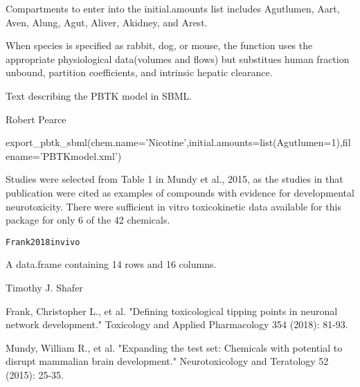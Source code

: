 \documentclass[a4paper]{book}
\begin{document}
%
\begin{Details}\relax
Compartments to enter into the initial.amounts list includes Agutlumen,
Aart, Aven, Alung, Agut, Aliver, Akidney, and Arest.

When species is specified as rabbit, dog, or mouse, the function uses the
appropriate physiological data(volumes and flows) but substitues human
fraction unbound, partition coefficients, and intrinsic hepatic clearance.
\end{Details}
%
\begin{Value}
Text describing the PBTK model in SBML.
\end{Value}
%
\begin{Author}\relax
Robert Pearce
\end{Author}
%
\begin{Examples}
\begin{ExampleCode}


export_pbtk_sbml(chem.name='Nicotine',initial.amounts=list(Agutlumen=1),filename='PBTKmodel.xml')


\end{ExampleCode}
\end{Examples}
%
\begin{Description}\relax
Studies were selected from Table 1 in Mundy et al., 2015, as
the studies in that publication were cited as examples of
compounds with evidence for developmental neurotoxicity. There
were sufficient in vitro toxicokinetic data available for this
package for only 6 of the 42 chemicals.
\end{Description}
%
\begin{Usage}
\begin{verbatim}
Frank2018invivo
\end{verbatim}
\end{Usage}
%
\begin{Format}
A data.frame containing 14 rows and 16 columns.
\end{Format}
%
\begin{Author}\relax
Timothy J. Shafer
\end{Author}
%
\begin{References}\relax
Frank, Christopher L., et al. "Defining toxicological tipping points
in neuronal network development." Toxicology and Applied
Pharmacology 354 (2018): 81-93.

Mundy, William R., et al. "Expanding the test set: Chemicals with
potential to disrupt mammalian brain development." Neurotoxicology
and Teratology 52 (2015): 25-35.
\end{References}
\end{document}
